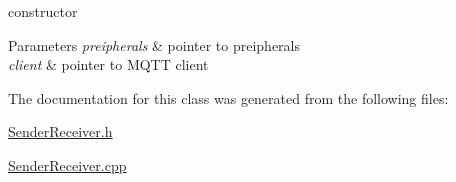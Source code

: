 constructor 


\begin{DoxyParams}{Parameters}
{\em preipherals} & pointer to preipherals \\
\hline
{\em client} & pointer to M\+Q\+TT client \\
\hline
\end{DoxyParams}


The documentation for this class was generated from the following files\+:\begin{DoxyCompactItemize}
\item 
\hyperlink{_sender_receiver_8h}{Sender\+Receiver.\+h}\item 
\hyperlink{_sender_receiver_8cpp}{Sender\+Receiver.\+cpp}\end{DoxyCompactItemize}
